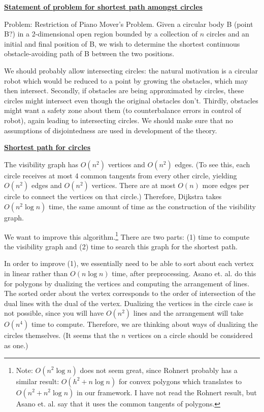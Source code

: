 \underline{\bf Statement of problem for shortest path amongst circles}

Problem: Restriction of Piano Mover's Problem.
	Given a circular body B (point B?) in a 2-dimensional open region
	bounded by a collection of $n$ circles and an initial and final
	position of B, we wish to determine the shortest continuous
	obstacle-avoiding path of B between the two positions.

We should probably allow intersecting circles: the natural motivation
is a circular robot which would be reduced to a point by growing the 
obstacles, which may then intersect.
Secondly, if obstacles are being approximated by circles,
these circles might intersect even though the original obstacles don't.
Thirdly, obstacles might want a safety zone about them (to counterbalance
errors in control of robot), again leading to intersecting circles.
We should make sure that no assumptions of disjointedness are used in 
development of the theory.


\underline{\bf Shortest path for circles}

The visibility graph has $O(n^{2})$ vertices and $O(n^{2})$ edges.
(To see this, each circle receives at most 4 common tangents from every other
circle, yielding $O(n^{2})$ edges and $O(n^{2})$ vertices.
There are at most $O(n)$ more edges per circle to connect the vertices
on that circle.)
Therefore, Dijkstra takes $O(n^{2} \log n)$ time, the same amount of time
as the construction of the visibility graph.

We want to improve this algorithm.\footnote{Note:
	$O(n^{2} \log n)$ does not seem great, since Rohnert probably 
	has a similar result: $O(h^{2} + n \log n)$ for convex polygons
	which translates to $O(n^{2} + n^{2} \log n)$ in our framework.
	I have not read the Rohnert result, but Asano et. al. say that
	it uses the common tangents of polygons.}
There are two parts: (1) time to compute the visibility graph and
(2) time to search this graph for the shortest path.

In order to improve (1), we essentially need to be able to sort about
each vertex in linear rather than $O(n \log n)$ time, after preprocessing.
Asano et. al. do this for polygons by dualizing the vertices and
computing the arrangement of lines.
The sorted order about the vertex corresponds to the order of intersection
of the dual lines with the dual of the vertex.
Dualizing the vertices in the circle case is not possible, 
since you will have $O(n^{2})$ lines and the arrangement will take
$O(n^4)$ time to compute.
Therefore, we are thinking about ways of dualizing the circles themselves.
(It seems that the $n$ vertices on a circle should be considered as one.)

